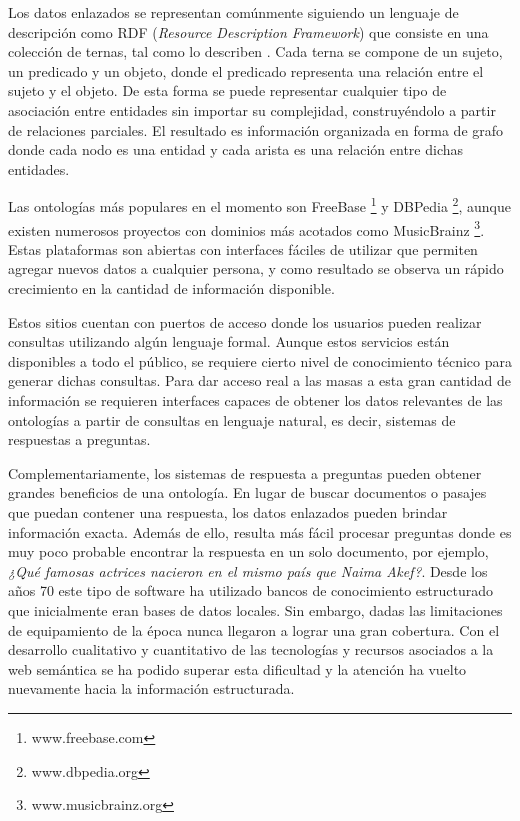 Los datos enlazados se representan comúnmente siguiendo un lenguaje de descripción como RDF (\textit{Resource Description Framework}) que consiste en una colección de ternas, tal como lo describen \citet{brickleyRDF}. Cada terna se compone de un sujeto, un predicado y un objeto, donde el predicado representa una relación entre el sujeto y el objeto. De esta forma se puede representar cualquier tipo de asociación entre entidades sin importar su complejidad, construyéndolo a partir de relaciones parciales. El resultado es información organizada en forma de grafo donde cada nodo es una entidad y cada arista es una relación entre dichas entidades.

Las ontologías más populares en el momento son FreeBase \footnote{www.freebase.com} y DBPedia \footnote{www.dbpedia.org}, aunque existen numerosos proyectos con dominios más acotados como MusicBrainz \footnote{www.musicbrainz.org}. Estas plataformas son abiertas con interfaces fáciles de utilizar que permiten agregar nuevos datos a cualquier persona, y como resultado se observa un rápido crecimiento en la cantidad de información disponible.

Estos sitios cuentan con puertos de acceso donde los usuarios pueden realizar consultas utilizando algún lenguaje formal. Aunque estos servicios están disponibles a todo el público, se requiere cierto nivel de conocimiento técnico para generar dichas consultas. Para dar acceso real a las masas a esta gran cantidad de información se requieren interfaces capaces de obtener los datos relevantes de las ontologías a partir de consultas en lenguaje natural, es decir, sistemas de respuestas a preguntas.

Complementariamente, los sistemas de respuesta a preguntas pueden obtener grandes beneficios de una ontología. En lugar de buscar documentos o pasajes que puedan contener una respuesta, los datos enlazados pueden brindar información exacta. Además de ello, resulta más fácil procesar preguntas donde es muy poco probable encontrar la respuesta en un solo documento, por ejemplo, \textit{¿Qué famosas actrices nacieron en el mismo país que Naima Akef?}. Desde los años 70 este tipo de software ha utilizado bancos de conocimiento estructurado que inicialmente eran bases de datos locales. Sin embargo, dadas las limitaciones de equipamiento de la época nunca llegaron a lograr una gran cobertura. Con el desarrollo cualitativo y cuantitativo de las tecnologías y recursos asociados a la web semántica se ha podido superar esta dificultad y la atención ha vuelto nuevamente hacia la información estructurada.

